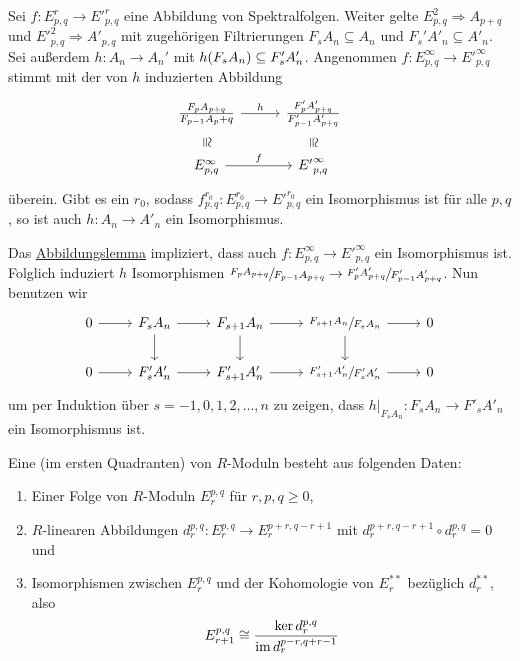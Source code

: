 \begin{satz}[name={Vergleichssatz}]
	Sei $f \colon E^r_{p,q} \to {E'}^r_{p,q}$ eine Abbildung von Spektralfolgen.
	Weiter gelte $E^2_{p,q} \Rightarrow A_{p+q}$ und ${E'}^2_{p,q} \Rightarrow A'_{p,q}$ mit zugehörigen Filtrierungen $F_s A_n \subseteq A_n$ und $F_s' A'_n \subseteq A'_n$.
	Sei außerdem $h \colon A_n \to A_n'$ mit $h \enbrace*{F_s A_n} \subseteq F_s' A'_n$.
	Angenommen $f \colon E^\infty_{p,q} \to {E'}^\infty_{p,q}$ stimmt mit der von $h$ induzierten Abbildung 
	\[
		\begin{tikzcd}[row sep=1.5em, column sep=2.8em]
			\frac{F_p A_{p+q}}{F_{p-1} A_p+q} \rar["h"] \dar[phantom,"\cong", sloped] &\frac{F'_p A'_{p+q}}{F'_{p-1} A'_{p+q}} \dar[phantom,"\cong", sloped] \\
			E^\infty_{p,q} \rar["f"] & {E'}^\infty_{p,q}
		\end{tikzcd}
	\]
	überein. 
	Gibt es ein $r_0$, sodass $f^{r_0}_{p,q} \colon E^{r_0}_{p,q} \to {E'}^{r_0}_{p,q}$ ein Isomorphismus ist für alle $p,q$, so ist auch $h \colon A_n \to A'_n$ ein Isomorphismus.
\end{satz}
\begin{beweis}
	Das \hyperref[abb.lemma]{Abbildungslemma} impliziert, dass auch $f \colon E^\infty_{p,q} \to {E'}^\infty_{p,q}$ ein Isomorphismus ist.
	Folglich induziert $h$ Isomorphismen $\sfrac{F_p A_{p+q}}{F_{p-1}A_{p+q}} \to \sfrac{F'_p A'_{p+q}}{F'_{p-1} A'_{p+q}}$.
	Nun benutzen wir
	\[
		\begin{tikzcd}
			0 \rar & F_s A_n \rar \dar & F_{s+1} A_n \rar \dar & \sfrac{F_{s+1} A_n}{F_s A_n} \rar \dar & 0 \\
			0 \rar & F'_s A'_n \rar  & F'_{s+1} A'_n \rar & \sfrac{F'_{s+1} A'_n}{F'_s A'_n} \rar  & 0 
		\end{tikzcd}
	\]
	um per Induktion über $s=-1,0,1,2, \ldots ,n$ zu zeigen, dass $h|_{F_s A_n} \colon F_s A_n \to F'_s A'_n$ ein Isomorphismus ist.
\end{beweis}

\begin{definition}[{name=[kohomologische Spektralfolge]}]
	Eine  (im ersten Quadranten) von $R$-Moduln besteht aus folgenden Daten:
	\begin{enumerate}[1.]
		\item Einer Folge von $R$-Moduln $E^{p,q}_r$ für $r,p,q\ge0$, 
		\item $R$-linearen Abbildungen $d^{p,q}_r \colon E^{p,q}_r \to E_r^{p+r,q-r+1}$ mit $d^{p+r,q-r+1}_r \circ d^{p,q}_r =0$ und
		\item Isomorphismen zwischen $E^{p,q}_r$ und der Kohomologie von $E_r^{**}$ bezüglich $d_r^{**}$, also 
		\[
			E^{p,q}_{r+1} \cong \frac{\ker d_r^{p,q}}{\operatorname{im} d^{p-r,q+r-1}_r} 
		\]
	\end{enumerate}
\end{definition}
\newpage

